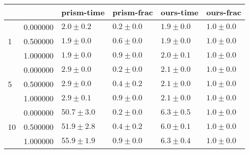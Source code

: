 \begin{tabular}{llllll}
\toprule
 &  & prism-time & prism-frac & ours-time & ours-frac \\
\midrule
\multirow[t]{3}{*}{1} & 0.000000 & $2.0 \pm 0.2$ & $0.2 \pm 0.0$ & $1.9 \pm 0.0$ & $1.0 \pm 0.0$ \\
 & 0.500000 & $1.9 \pm 0.0$ & $0.6 \pm 0.0$ & $1.9 \pm 0.0$ & $1.0 \pm 0.0$ \\
 & 1.000000 & $1.9 \pm 0.0$ & $0.9 \pm 0.0$ & $2.0 \pm 0.1$ & $1.0 \pm 0.0$ \\
\cline{1-6}
\multirow[t]{3}{*}{5} & 0.000000 & $2.9 \pm 0.0$ & $0.2 \pm 0.0$ & $2.1 \pm 0.0$ & $1.0 \pm 0.0$ \\
 & 0.500000 & $2.9 \pm 0.0$ & $0.4 \pm 0.2$ & $2.1 \pm 0.0$ & $1.0 \pm 0.0$ \\
 & 1.000000 & $2.9 \pm 0.1$ & $0.9 \pm 0.0$ & $2.1 \pm 0.0$ & $1.0 \pm 0.0$ \\
\cline{1-6}
\multirow[t]{3}{*}{10} & 0.000000 & $50.7 \pm 3.0$ & $0.2 \pm 0.0$ & $6.3 \pm 0.5$ & $1.0 \pm 0.0$ \\
 & 0.500000 & $51.9 \pm 2.8$ & $0.4 \pm 0.2$ & $6.0 \pm 0.1$ & $1.0 \pm 0.0$ \\
 & 1.000000 & $55.9 \pm 1.9$ & $0.9 \pm 0.0$ & $6.3 \pm 0.4$ & $1.0 \pm 0.0$ \\
\cline{1-6}
\bottomrule
\end{tabular}
